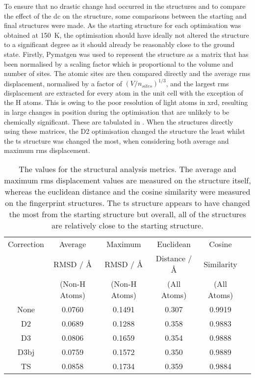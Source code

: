 To ensure that no drastic change had occurred in the structures and to compare the effect of the \acrshort{dc} on the structure, some comparisons between the starting and final structures were made. As the starting structure for each optimisation was obtained at \SI{150}{K}, the optimisation should have ideally not altered the structure to a significant degree as it should already be reasonably close to the ground state. Firstly, Pymatgen \DIFdelbegin \DIFdel{~}\DIFdelend \cite{Ong2013} was used to represent the structure as a matrix that has been normalised by a scaling factor which is proportional to the volume and number of sites. The atomic sites are then compared directly and the average \acrshort{rms} displacement, normalised by a factor of \((V/n_{sites})^{1/3}\), and the largest \acrshort{rms} displacement are extracted for every atom in the unit cell with the exception of the H atoms. This is owing to the poor resolution of light atoms in \acrshort{xrd}, resulting in large changes in position during the optimisation that are unlikely to be chemically significant. These are tabulated in . When the structures directly using these matrices, the D2 optimisation changed the structure the least whilst the \acrshort{ts} structure was changed the most, when considering both average and maximum \acrshort{rms} displacement.

\begin{table}[h]
\centering
\begin{tabular}{@{}cccccc@{}}
\toprule
Correction & Average & Maximum & Euclidean & Cosine \\
 & RMSD / {\AA} & RMSD / {\AA} & Distance / {\AA} & Similarity \\ 
 & (Non-H Atoms) & (Non-H Atoms) & (All Atoms) & (All Atoms) \\ \midrule
None &
  0.0760 &
  0.1491 &
  0.307 &
  0.9919 \\
D2 &
  0.0689 &
  0.1288 &
  0.358 &
  0.9883 \\
D3 &
 0.0806 & 
 0.1659 &
 0.354  & 
 0.9888 & \\
D3\acrshort{bj} &
  0.0759 &
  0.1572 &
  0.350 &
  0.9889 \\
TS &
  0.0858 &
  0.1734 &
  0.359 &
  0.9884 \\ \bottomrule
\end{tabular}
\captionsetup{font = footnotesize, justification = centering}
\caption[The Values for the Structural Analysis Metrics]{The values for the structural analysis metrics. The average and maximum \acrshort{rms} displacement values are measured on the structure itself, whereas the euclidean distance and the cosine similarity were measured on the fingerprint structures. The \acrshort{ts} structure appears to have changed the most from the starting structure but overall, all of the structures are relatively close to the starting structure.}
\label{tab:struct_similarity}
\end{table}

